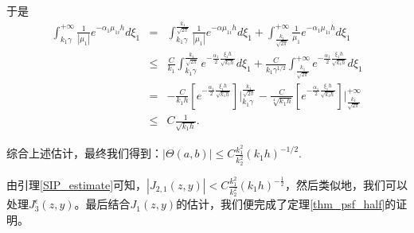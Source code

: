 于是
\begin{eqnarray*}
\int_{k_1\gamma}^{+\infty}\frac{1}{|\mu_1|}e^{-\alpha_1\mu_{1i}h}d\xi_1&=&
\int_{k_1\gamma}^{\frac{k_1}{\sqrt{2\pi}}}\frac{1}{|\mu_1|}e^{-\alpha\mu_{1i}h}d\xi_1
+\int_{\frac{k_1}{\sqrt{2\pi}}}^{+\infty}\frac{1}{\mu_1}e^{-\alpha_1\mu_{1i}h}d\xi_1\\
&\leq&\frac{C}{k_1}\int_{k_1\gamma}^{\frac{k_1}{\sqrt{2\pi}}}e^{-\frac{\alpha_1}{2}\frac{\xi_1h}{\sqrt{k_1h}}}d\xi_1
+\frac{C}{k_1\gamma^{1/2}}\int_{\frac{k_1}{\sqrt{2\pi}}}^{+\infty}e^{-\frac{\alpha_1}{2}\frac{\xi_1h}{\sqrt{k_1h}}}d\xi_1\\
&=&-\frac{C}{k_1h}\left[e^{-\frac{\alpha_1}{2}\frac{\xi_1h}{\sqrt{k_1h}}}\right]\Bigg|_{k_1\gamma}^{\frac{k_1}{\sqrt{2\pi}}}
-\frac{C}{\sqrt[4]{k_1h}}\left[e^{-\frac{\alpha_1}{2}\frac{\xi_1h}{\sqrt{k_1h}}}\right]\Bigg|_{\frac{k_1}{\sqrt{2\pi}}}^{+\infty}\\
&\leq&C\frac{1}{{\sqrt{k_1h}}}.
\end{eqnarray*}

综合上述估计，最终我们得到：$\left|\Theta(a,b)\right|\leq C\frac{k_1^2}{k_2^2}(k_1h)^{-1/2}$.
\finproof

由引理\ref{SIP_estimate}可知，$\left|J_{2,1}(z,y)\right|<C\frac{k_1^2}{k_2^2}(k_1h)^{-\frac{1}{2}}$，然后类似地，我们可以处理$J_3^{\epsilon}(z,y)$。最后结合$J_1(z,y)$的估计，我们便完成了定理\ref{thm_psf_half}的证明。
